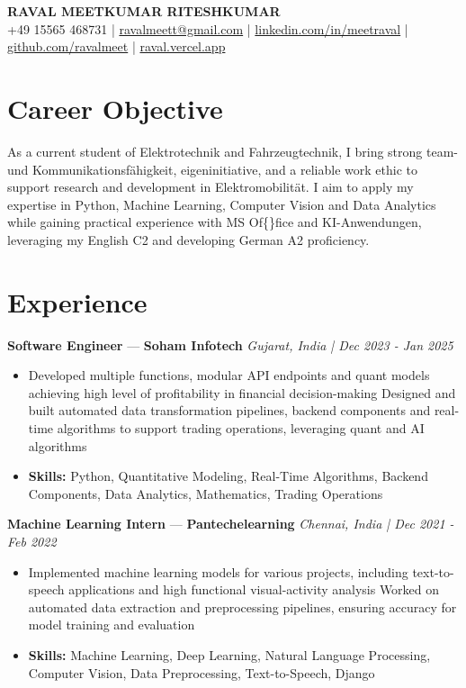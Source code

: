 \documentclass[a4paper,10pt]{article}
\begin{document}
\begin{center}
  {\Large\bfseries RAVAL MEETKUMAR RITESHKUMAR}\\[2pt]
  {\small +49 15565 468731 \;|\; \href{mailto:ravalmeett@gmail.com}{ravalmeett@gmail.com} \;|\; \href{https://www.linkedin.com/in/meetraval/}{linkedin.com/in/meetraval} \;|\; \href{https://github.com/ravalmeet}{github.com/ravalmeet} \;|\; \href{https://raval.vercel.app/}{raval.vercel.app}}
\end{center}
\vspace{-3pt}

\section*{Career Objective}
As a current student of Elektrotechnik and Fahrzeugtechnik, I bring strong team- und Kommunikationsfähigkeit, eigeninitiative, and a reliable work ethic to support research and development in Elektromobilität. I aim to apply my expertise in Python, Machine Learning, Computer Vision and Data Analytics while gaining practical experience with MS Of\{\}fice and KI-Anwendungen, leveraging my English C2 and developing German A2 proficiency.\par

\section*{Experience}
\textbf{Software Engineer} — \textbf{Soham Infotech} \hfill \textit{Gujarat, India \;|\; Dec 2023 - Jan 2025}\par
\vspace{1pt}
\begin{itemize}
  \item Developed multiple functions, modular API endpoints and quant models achieving high level of profitability in financial decision-making Designed and built automated data transformation pipelines, backend components and real-time algorithms to support trading operations, leveraging quant and AI algorithms
  \item \textbf{Skills:} Python, Quantitative Modeling, Real-Time Algorithms, Backend Components, Data Analytics, Mathematics, Trading Operations
\end{itemize}
\vspace{3pt}
\textbf{Machine Learning Intern} — \textbf{Pantechelearning} \hfill \textit{Chennai, India \;|\; Dec 2021 - Feb 2022}\par
\vspace{1pt}
\begin{itemize}
  \item Implemented machine learning models for various projects, including text-to-speech applications and high functional visual-activity analysis Worked on automated data extraction and preprocessing pipelines, ensuring accuracy for model training and evaluation
  \item \textbf{Skills:} Machine Learning, Deep Learning, Natural Language Processing, Computer Vision, Data Preprocessing, Text-to-Speech, Django
\end{itemize}
\end{document}
